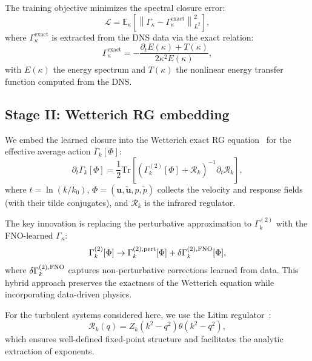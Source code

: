 The training objective minimizes the spectral closure error:
\begin{equation}
\mathcal{L} = \mathbb{E}_{\kappa}\left[\left\|\Gamma_\kappa - \Gamma_\kappa^{\mathrm{exact}}\right\|_{L^2}^2\right],
\end{equation}
where $\Gamma_\kappa^{\mathrm{exact}}$ is extracted from the DNS data via the exact relation:
\begin{equation}
\Gamma_\kappa^{\mathrm{exact}} = -\frac{\partial_t E(\kappa) + T(\kappa)}{2\kappa^2 E(\kappa)},
\end{equation}
with $E(\kappa)$ the energy spectrum and $T(\kappa)$ the nonlinear energy transfer function computed from the DNS.

\subsection{Stage II: Wetterich RG embedding\label{subsec:stage2}}

We embed the learned closure into the Wetterich exact RG equation~\cite{wetterich1993exact} for the effective average action $\Gamma_k[\Phi]$:
{\small
\begin{equation} \label{eq:wetterich}
\partial_t \Gamma_k[\Phi] = \frac{1}{2}\mathrm{Tr}\left[\left(\Gamma_k^{(2)}[\Phi] + \mathcal{R}_k\right)^{-1}\partial_t \mathcal{R}_k\right],
\end{equation}
}
where $t = \ln(k/k_0)$, $\Phi = (\mathbf{u}, \tilde{\mathbf{u}}, p, \tilde{p})$ collects the velocity and response fields (with their tilde conjugates), and $\mathcal{R}_k$ is the infrared regulator.

The key innovation is replacing the perturbative approximation to $\Gamma_k^{(2)}$ with the FNO-learned $\Gamma_\kappa$:
\begin{equation}
\Gamma_k^{(2)}[\Phi] \to \Gamma_k^{(2),\mathrm{pert}}[\Phi] + \delta\Gamma_k^{(2),\text{FNO}}[\Phi],
\end{equation}
where $\delta\Gamma_k^{(2),\text{FNO}}$ captures non-perturbative corrections learned from data. This hybrid approach preserves the exactness of the Wetterich equation while incorporating data-driven physics.

For the turbulent systems considered here, we use the Litim regulator~\cite{litim2001optimised}:
\begin{equation}
\mathcal{R}_k(q) = Z_k(k^2 - q^2)\theta(k^2 - q^2),
\end{equation}
which ensures well-defined fixed-point structure and facilitates the analytic extraction of exponents.

